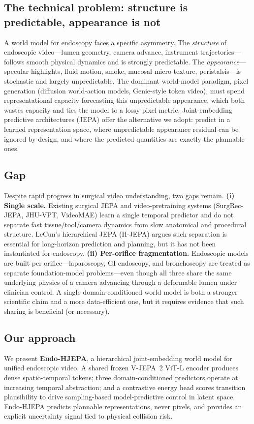 \documentclass[final,3p,times,twocolumn]{elsarticle}
\begin{document}
\subsection{The technical problem: structure is predictable, appearance is not}
A world model for endoscopy faces a specific asymmetry. The \emph{structure} of endoscopic video---lumen geometry, camera advance, instrument trajectories---follows smooth physical dynamics and is strongly predictable. The \emph{appearance}---specular highlights, fluid motion, smoke, mucosal micro-texture, peristalsis---is stochastic and largely unpredictable. The dominant world-model paradigm, pixel generation (diffusion world-action models, Genie-style token video), must spend representational capacity forecasting this unpredictable appearance, which both wastes capacity and ties the model to a lossy pixel metric. Joint-embedding predictive architectures (JEPA) offer the alternative we adopt: predict in a learned representation space, where unpredictable appearance residual can be ignored by design, and where the predicted quantities are exactly the plannable ones.

\subsection{Gap}
Despite rapid progress in surgical video understanding, two gaps remain. \textbf{(i) Single scale.} Existing surgical JEPA and video-pretraining systems (SurgRec-JEPA, JHU-VPT, VideoMAE) learn a single temporal predictor and do not separate fast tissue/tool/camera dynamics from slow anatomical and procedural structure. LeCun's hierarchical JEPA (H-JEPA) argues such separation is essential for long-horizon prediction and planning, but it has not been instantiated for endoscopy. \textbf{(ii) Per-orifice fragmentation.} Endoscopic models are built per orifice---laparoscopy, GI endoscopy, and bronchoscopy are treated as separate foundation-model problems---even though all three share the same underlying physics of a camera advancing through a deformable lumen under clinician control. A single domain-conditioned world model is both a stronger scientific claim and a more data-efficient one, but it requires evidence that such sharing is beneficial (or necessary).

\subsection{Our approach}
We present \textbf{Endo-HJEPA}, a hierarchical joint-embedding world model for unified endoscopic video. A shared frozen V-JEPA~2 ViT-L encoder produces dense spatio-temporal tokens; three domain-conditioned predictors operate at increasing temporal abstraction; and a contrastive energy head scores transition plausibility to drive sampling-based model-predictive control in latent space. Endo-HJEPA predicts plannable representations, never pixels, and provides an explicit uncertainty signal tied to physical collision risk.
\end{document}

